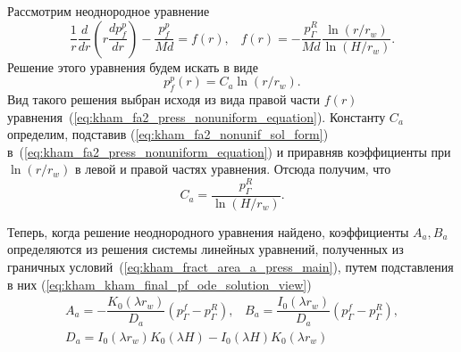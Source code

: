 \documentclass{article}
\begin{document}
Рассмотрим неоднородное уравнение
\begin{equation}
\displaystyle
\dfrac{1}{r}\dfrac{d}{dr}\left(r\dfrac{d p_f^p}{dr}\right) - \dfrac{p_f^p}{Md} = f\left(r\right), \;\;\;
f\left(r\right) = - \dfrac{p^R_{\Gamma}}{Md} \dfrac{\ln{\left(r/r_w\right)}}{\ln{\left(H/r_w\right)}}.
\label{eq:kham_fa2_press_nonuniform_equation}
\end{equation}
Решение этого уравнения будем искать в виде
\begin{equation}
\displaystyle
p_f^p\left(r\right) = C_a \ln\left(r/r_w\right).
\label{eq:kham_fa2_nonunif_sol_form}
\end{equation}
Вид такого решения выбран исходя из вида правой части $f\left(r\right)$ уравнения~(\ref{eq:kham_fa2_press_nonuniform_equation}). Константу $C_a$ определим, подставив (\ref{eq:kham_fa2_nonunif_sol_form}) в~(\ref{eq:kham_fa2_press_nonuniform_equation}) и приравняв коэффициенты при $\ln\left(r/r_w\right)$ в левой и правой частях уравнения. Отсюда получим, что
\begin{equation}
\displaystyle
C_a = \dfrac{p^R_{\Gamma}}{\ln{\left(H/r_w\right)}}.
\label{eq:kham_sol_nonunif_c_cf}
\end{equation}

Теперь, когда решение неоднородного уравнения найдено, коэффициенты $A_a, B_a$ определяются из решения системы линейных уравнений, полученных из граничных условий~(\ref{eq:kham_fract_area_a_press_main}), путем подставления в них (\ref{eq:kham_kham_final_pf_ode_solution_view})
\begin{equation}
\displaystyle
\begin{gathered}
A_a = - \dfrac{K_0 \left(\lambda r_w\right)}{D_a} \left(p^f_{\Gamma} - p^R_{\Gamma}\right), \;\;\;
B_a = \dfrac{I_0 \left(\lambda r_w\right)}{D_a} \left(p^f_{\Gamma} - p^R_{\Gamma}\right), \\[6pt]
D_a = I_0 \left(\lambda r_w \right)K_0\left(\lambda H\right) - I_0\left(\lambda H\right) K_0\left(\lambda r_w\right)
\end{gathered}
\label{eq:kham_fa2_press_ab_sol}
\end{equation}
\end{document}
